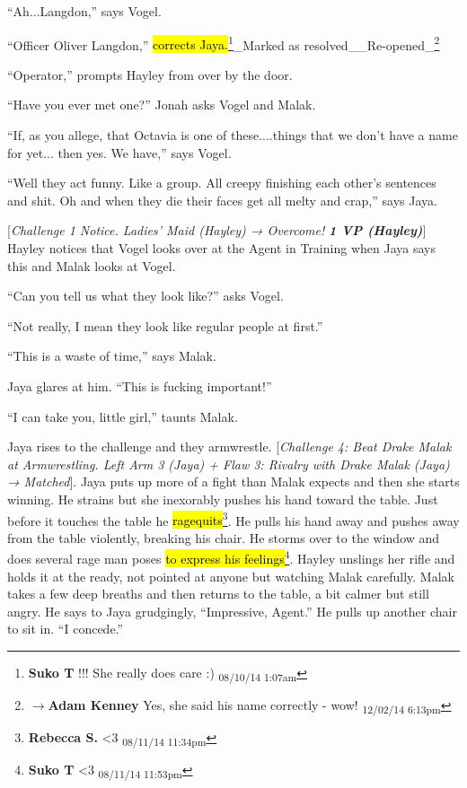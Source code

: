 ``Ah...Langdon,'' says Vogel.

``Officer Oliver Langdon,'' \hl{corrects Jaya.}\footnote{\textbf{Suko T }!!!  She really does care :) \textsubscript{08/10/14 1:07am}}\_Marked as resolved\_\_Re-opened\_\footnote{$\rightarrow$\textbf{Adam Kenney }Yes, she said his name correctly - wow! \textsubscript{12/02/14 6:13pm}}

``Operator,'' prompts Hayley from over by the door.

``Have you ever met one?'' Jonah asks Vogel and Malak.

``If, as you allege, that Octavia is one of these....things that we don't have a name for yet... then yes.  We have,'' says Vogel.

``Well they act funny.  Like a group.   All creepy finishing each other's sentences and shit.  Oh and when they die their faces get all melty and crap,'' says Jaya.

{[}\textit{Challenge 1 Notice.  Ladies' Maid (Hayley) → Overcome! }\textit{\textbf{1 VP (Hayley)}}{]}  Hayley notices that Vogel looks over at the Agent in Training when Jaya says this and Malak looks at Vogel.

``Can you tell us what they look like?'' asks Vogel.

``Not really, I mean they look like regular people at first.''

``This is a waste of time,'' says Malak.

Jaya glares at him.  ``This is fucking important!''

``I can take you, little girl,'' taunts Malak.



Jaya rises to the challenge and they armwrestle.  {[}\textit{Challenge 4: Beat Drake Malak at Armwrestling.  Left Arm 3 (Jaya) + Flaw 3: Rivalry with Drake Malak (Jaya) → Matched}{]}.  Jaya puts up more of a fight than Malak expects and then she starts winning. He strains but she inexorably pushes his hand toward the table. Just before it touches the table he \hl{ragequits}\footnote{\textbf{Rebecca S. }\textless 3 \textsubscript{08/11/14 11:34pm}}.  He pulls his hand away and pushes away from the table violently, breaking his chair.  He storms over to the window and does several rage man poses \hl{to express his feelings}\footnote{\textbf{Suko T }\textless 3 \textsubscript{08/11/14 11:53pm}}.  Hayley unslings her rifle and holds it at the ready, not pointed at anyone but watching Malak carefully.  Malak takes a few deep breaths and then returns to the table, a bit calmer but still angry.  He says to Jaya grudgingly, ``Impressive, Agent.''  He pulls up another chair to sit in.   ``I concede.''

